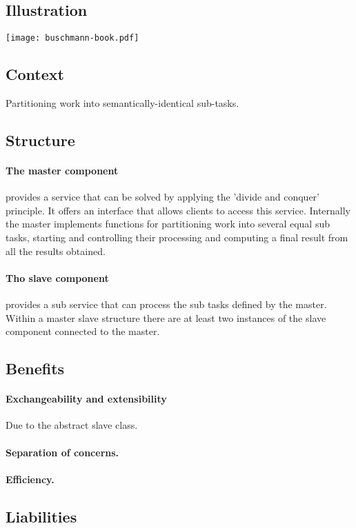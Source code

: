 \documentclass[a4paper,11pt,twocolumn]{report}
\begin{document}
    \subsection{Illustration}
    \texttt{[image: buschmann-book.pdf]}
    \subsection{Context}
    Partitioning work into semantically-identical sub-tasks.
    \subsection{Structure}
    \paragraph{The master component} provides a service that can be solved by
    applying the 'divide and conquer' principle. It offers an interface that
    allows clients to access this service. Internally the master implements
    functions for partitioning work into several equal sub tasks, starting and
    controlling their processing and computing a final result from all the
    results obtained.
    \paragraph{Tho slave component} provides a sub service that can process the
    sub tasks defined by the master. Within a master slave structure there are
    at least two instances of the slave component connected to the master.
    \subsection{Benefits}
    \paragraph{Exchangeability and extensibility} Due to the abstract slave
    class.
    \paragraph{Separation of concerns.}
    \paragraph{Efficiency.}
    \subsection{Liabilities}
\end{document}
